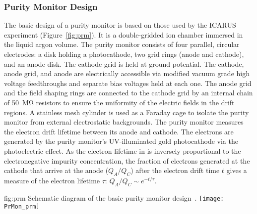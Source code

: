 \subsubsection{Purity Monitor Design}

The basic design of a purity monitor is based on those used by the ICARUS experiment (Figure~\ref{fig:prm})\cite{Adamowski:2014daa}. It is a double-gridded ion chamber immersed in the liquid argon volume.   The purity monitor consists of four parallel, circular electrodes: a disk holding a photocathode, two grid rings (anode and cathode), and an anode disk. The cathode grid is held at ground potential. The cathode, anode grid, and anode are electrically accessible via modified vacuum grade high voltage feedthroughs and separate bias voltages held at each one.  The anode grid and the field shaping rings are connected to the cathode grid by an internal chain of \SI{50}{\mega\ohm} resistors to ensure the uniformity of the electric fields in the drift regions. A stainless mesh cylinder is used as a Faraday cage to isolate the purity monitor from external electrostatic backgrounds. The purity monitor measures the electron drift lifetime between its anode and cathode. The electrons are generated by the purity monitor's UV-illuminated gold photocathode via the photoelectric effect. As the electron lifetime in  is inversely proportional to the electronegative impurity concentration, the fraction of electrons generated at the cathode that arrive at the anode ($Q_A/Q_C$) after the electron drift time $t$ gives a measure of the electron lifetime $\tau$:
%
\( Q_A/Q_C \sim e^{-t/\tau}.\)

\begin{dunefigure}{fig:prm}
  {Schematic diagram of the basic purity monitor design~\cite{Adamowski:2014daa}.}
  \texttt{[image: PrMon\_prm]}
\end{dunefigure}

